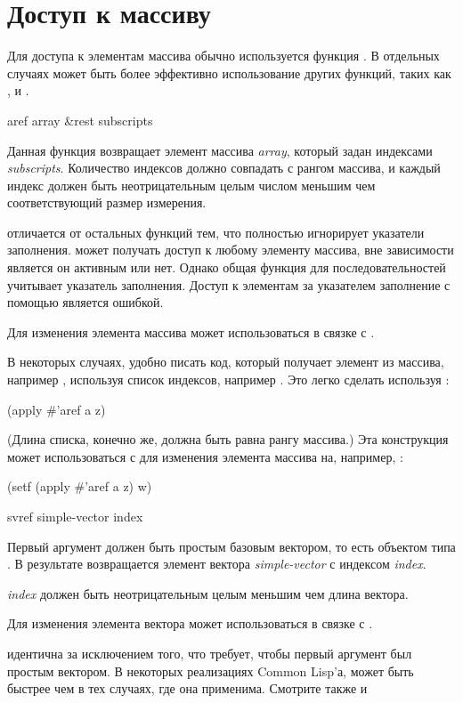 \section{Доступ к массиву}

Для доступа к элементам массива обычно используется функция .
В отдельных случаях может быть более эффективно использование
других функций, таких как ,  и .

\begin{defun}[Функция]
aref array &rest subscripts

Данная функция возвращает элемент массива \emph{array}, который задан индексами
\emph{subscripts}. Количество индексов должно совпадать с рангом массива, и
каждый индекс должен быть неотрицательным целым числом меньшим чем
соответствующий размер измерения.

 отличается от остальных функций тем, что полностью игнорирует
указатели заполнения.
 может получать доступ к любому элементу массива, вне зависимости
является он активным или нет. Однако общая функция для последовательностей
 учитывает указатель заполнения. Доступ к элементам за указателем
заполнение с помощью  является ошибкой.

Для изменения элемента массива может использоваться  в связке с
.

В некоторых случаях, удобно писать код, который получает элемент из массива,
например , используя список индексов, например .
Это легко сделать используя :
\begin{lisp}
(apply \#'aref a z)
\end{lisp}
(Длина списка, конечно же, должна быть равна рангу массива.) Эта конструкция
может использоваться с  для изменения элемента массива на, например,
:
\begin{lisp}
(setf (apply \#'aref a z) w)
\end{lisp}
\end{defun}

\begin{defun}[Функция]
svref simple-vector index

Первый аргумент должен быть простым базовым вектором, то есть объектом типа
.
В результате возвращается элемент вектора \emph{simple-vector} с индексом
\emph{index}.

\emph{index} должен быть неотрицательным целым меньшим чем длина вектора.

Для изменения элемента вектора может использоваться  в связке с
.

 идентична  за исключением того, что требует, чтобы первый
аргумент был простым вектором. В некоторых реализациях Common Lisp'а,
 может быть быстрее чем  в
тех случаях, где она применима.
Смотрите также  и 
\end{defun}

